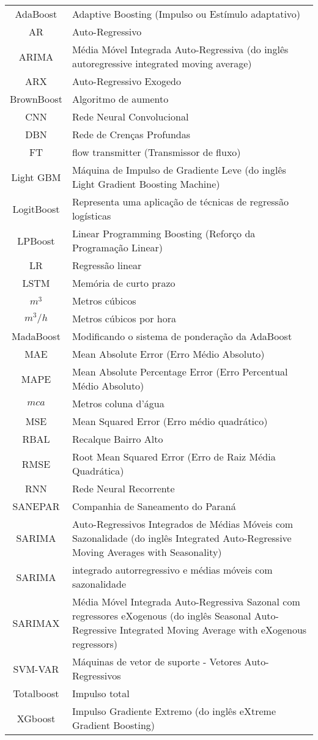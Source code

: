 \begin{tabular}{cp{}}
	AdaBoost & Adaptive Boosting (Impulso ou Estímulo adaptativo)\\
	AR & Auto-Regressivo\\
	ARIMA & Média Móvel Integrada Auto-Regressiva (do inglês autoregressive integrated moving average) \\
	ARX & Auto-Regressivo Exogedo\\ 
	BrownBoost & Algoritmo de aumento\\
	CNN & Rede Neural Convolucional\\
	DBN & Rede de Crenças Profundas \\
	FT & flow transmitter (Transmissor de fluxo)\\
	Light GBM & Máquina de Impulso de Gradiente Leve (do inglês Light Gradient Boosting Machine) \\
	LogitBoost & Representa uma aplicação de técnicas de regressão logísticas\\
	LPBoost & Linear Programming Boosting (Reforço da Programação Linear)\\
	LR & Regressão linear\\
	LSTM & Memória de curto prazo\\
	$ m^3 $ & Metros cúbicos\\
	$ m^3/h $ & Metros cúbicos por hora\\
	MadaBoost & Modificando o sistema de ponderação da AdaBoost\\
	MAE & Mean Absolute Error (Erro Médio Absoluto)\\
	MAPE &  Mean Absolute Percentage Error (Erro Percentual Médio Absoluto)\\
	$ mca $ & Metros coluna d’água\\
	MSE & Mean Squared Error (Erro médio quadrático)\\
	RBAL & Recalque Bairro Alto\\
	RMSE & Root Mean Squared Error (Erro de Raiz Média Quadrática)\\
	RNN & Rede Neural Recorrente\\
	SANEPAR & Companhia de Saneamento do Paraná \\
	SARIMA & Auto-Regressivos Integrados de Médias Móveis com Sazonalidade (do inglês Integrated Auto-Regressive Moving Averages with Seasonality) \\
	SARIMA & integrado autorregressivo e médias móveis com sazonalidade\\
	SARIMAX &  Média Móvel Integrada Auto-Regressiva Sazonal com regressores eXogenous (do inglês Seasonal Auto-Regressive Integrated Moving Average with eXogenous regressors) \\
	SVM-VAR & Máquinas de vetor de suporte - Vetores Auto-Regressivos\\
	Totalboost & Impulso total\\
	XGboost & Impulso Gradiente Extremo (do inglês eXtreme Gradient Boosting) 
\end{tabular}





